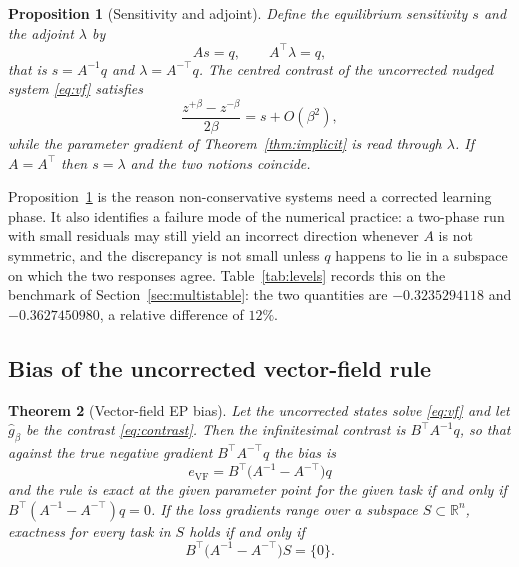 \documentclass[11pt]{article}
\newtheorem{theorem}{Theorem}
\newtheorem{proposition}[theorem]{Proposition}
\theoremstyle{definition}
\theoremstyle{remark}
\newcommand{\R}{\mathbb{R}}
\begin{document}
\begin{proposition}[Sensitivity and adjoint]\label{prop:sens}
Define the equilibrium sensitivity $s$ and the adjoint $\lambda$ by
\begin{equation}
A s = q, \qquad A^{\top} \lambda = q,
\label{eq:sens}
\end{equation}
that is $s = A^{-1}q$ and $\lambda = A^{-\top}q$. The centred contrast of the uncorrected nudged
system \eqref{eq:vf} satisfies
\begin{equation}
\frac{z^{+\beta} - z^{-\beta}}{2\beta} = s + O(\beta^2),
\end{equation}
while the parameter gradient of Theorem~\ref{thm:implicit} is read through $\lambda$. If
$A = A^{\top}$ then $s = \lambda$ and the two notions coincide.
\end{proposition}

Proposition~\ref{prop:sens} is the reason non-conservative systems need a corrected learning
phase. It also identifies a failure mode of the numerical practice: a two-phase run with small
residuals may still yield an incorrect direction whenever $A$ is not symmetric, and the
discrepancy is not small unless $q$ happens to lie in a subspace on which the two responses agree. Table~\ref{tab:levels} records this on the benchmark of
Section~\ref{sec:multistable}: the two quantities are $-0.3235294118$ and $-0.3627450980$,
a relative difference of $12\%$.

\subsection{Bias of the uncorrected vector-field rule}

\begin{theorem}[Vector-field EP bias]\label{thm:vf}
Let the uncorrected states solve \eqref{eq:vf} and let $\widehat{g}_\beta$ be the contrast
\eqref{eq:contrast}. Then the infinitesimal contrast is $B^{\top}A^{-1}q$, so that against the
true negative gradient $B^{\top}A^{-\top}q$ the bias is
\begin{equation}
\boxed{\ e_{\mathrm{VF}} = B^{\top}\bigl(A^{-1} - A^{-\top}\bigr) q\ }
\label{eq:vf-bias}
\end{equation}
and the rule is exact at the given parameter point for the given task if and only if
$B^{\top}(A^{-1}-A^{-\top})q = 0$. If the loss gradients range over a subspace $S \subset \R^n$,
exactness for every task in $S$ holds if and only if
\begin{equation}
B^{\top}\bigl(A^{-1} - A^{-\top}\bigr) S = \{0\}.
\label{eq:vf-subspace}
\end{equation}
\end{theorem}
\end{document}
